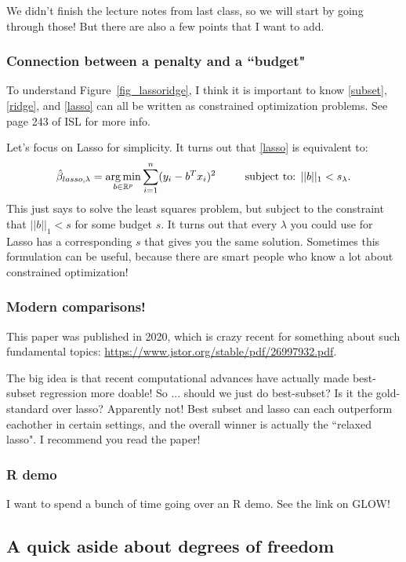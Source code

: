 We didn't finish the lecture notes from last class, so we will start by going through those! But there are also a few points that I want to add. 

\subsubsection{Connection between a penalty and a ``budget"}

To understand Figure~\ref{fig_lassoridge}, I think it is important to know \eqref{subset}, \eqref{ridge},  and \eqref{lasso} can all be written as constrained optimization problems. See page 243 of ISL for more info. 

Let's focus on Lasso for simplicity. It turns out that \eqref{lasso} is equivalent to:
$$
\hat{\beta}_{lasso,\lambda}  = \argmin_{b \in \mathbb{R}^p} \sum_{i=1}^n 	(y_i - b^T x_i)^2 \ \ \ \ \ \ \ \text{        subject to:     } ||b||_1 < s_\lambda. 
$$
This just says to solve the least squares problem, but subject to the constraint that $||b||_1 < s$ for some budget $s$. It turns out that every $\lambda$ you could use for Lasso has a corresponding $s$ that gives you the same solution. Sometimes this formulation can be useful, because there are smart people who know a lot about constrained optimization! 


\subsubsection{Modern comparisons!}

This paper was published in 2020, which is crazy recent for something about such fundamental topics:
\url{https://www.jstor.org/stable/pdf/26997932.pdf}. 

The big idea is that recent computational advances have actually made best-subset regression more doable! So ... should we just do best-subset? Is it the gold-standard over lasso? Apparently not! Best subset and lasso can each outperform eachother in certain settings, and the overall winner is actually the ``relaxed lasso". I recommend you read the paper! 

\subsubsection{R demo}

I want to spend a bunch of time going over an R demo. See the link on GLOW! 


\subsection{A quick aside about degrees of freedom}

